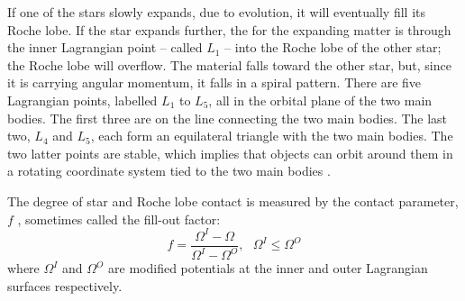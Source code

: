 If one of the stars slowly expands, due to evolution, it will eventually fill its
Roche lobe. If the star expands further, the  for the expanding matter
is through the inner Lagrangian point -- called $L_{1}$ -- into the Roche lobe of the
other star; the Roche lobe will overflow. The material falls toward the other star,
but, since it is carrying angular momentum, it falls in a spiral pattern.
There are five Lagrangian points, labelled $L_{1}$ to $L_{5}$, all in the orbital plane of the two main bodies. The first three are on the line connecting the two main bodies.
The last two, $L_{4}$ and $L_{5}$, each form an equilateral triangle with the two main bodies. The two latter points are stable, which implies that objects can orbit around them in a rotating coordinate system tied to the two main bodies \citep{Percy2007}.

The degree of star and Roche lobe contact is measured by the contact parameter, $f$ , sometimes
called the fill-out factor:
\begin{equation}
f = \dfrac{\Omega^{I}-\Omega}{\Omega^{I}-\Omega^{O}}, ~~~ \Omega^{I}\leq \Omega^{O}
\end{equation}
where $\Omega^{I}$ and $\Omega^{O}$ are modified potentials at the inner and outer Lagrangian surfaces respectively. 

